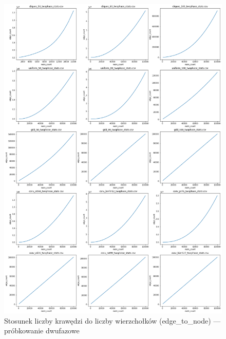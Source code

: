\begin{figure}[]
    \centering
    \includegraphics[width=\textwidth]{chapters/experiments/img/merged_plots/main_twophase/edge_count.png}
    \caption{Stosunek liczby krawędzi do liczby wierzchołków (edge\_to\_node) --- próbkowanie dwufazowe}
    \label{fig:included_twophase_edges}
\end{figure}

